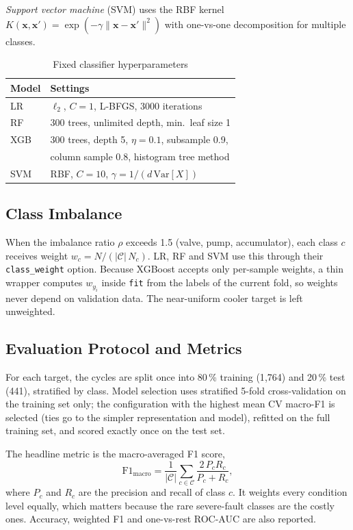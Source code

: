 \documentclass[conference]{IEEEtran}
\begin{document}
\textit{Support vector machine} (SVM) \cite{cortes1995} uses the RBF kernel
$K(\mathbf{x},\mathbf{x}')=\exp(-\gamma\lVert\mathbf{x}-\mathbf{x}'\rVert^2)$
with one-vs-one decomposition for multiple classes.

\begin{table}[t]
\centering
\caption{Fixed classifier hyperparameters}
\label{tab:hyper}
\begin{tabular}{@{}ll@{}}
\toprule
Model & Settings \\
\midrule
LR & $\ell_2$, $C=1$, L-BFGS, 3000 iterations \\
RF & 300 trees, unlimited depth, min.\ leaf size 1 \\
XGB & 300 trees, depth 5, $\eta=0.1$, subsample 0.9, \\
    & column sample 0.8, histogram tree method \\
SVM & RBF, $C=10$, $\gamma=1/(d\,\mathrm{Var}[X])$ \\
\bottomrule
\end{tabular}
\end{table}

\subsection{Class Imbalance}
When the imbalance ratio $\rho$ exceeds 1.5 (valve, pump, accumulator), each
class $c$ receives weight $w_c=N/(|\mathcal{C}|\,N_c)$. LR, RF and SVM use
this through their \texttt{class\_weight} option. Because XGBoost accepts only
per-sample weights, a thin wrapper computes $w_{y_i}$ inside \texttt{fit} from
the labels of the current fold, so weights never depend on validation data.
The near-uniform cooler target is left unweighted.

\subsection{Evaluation Protocol and Metrics}
For each target, the cycles are split once into 80\,\% training (1{,}764) and
20\,\% test (441), stratified by class. Model selection uses stratified 5-fold
cross-validation on the training set only; the configuration with the highest
mean CV macro-F1 is selected (ties go to the simpler representation and
model), refitted on the full training set, and scored exactly once on the
test set.

The headline metric is the macro-averaged F1 score,
\begin{equation}
\mathrm{F1}_{\text{macro}}=\frac{1}{|\mathcal{C}|}\sum_{c\in\mathcal{C}}
\frac{2\,P_c R_c}{P_c+R_c},
\end{equation}
where $P_c$ and $R_c$ are the precision and recall of class $c$. It weights
every condition level equally, which matters because the rare severe-fault
classes are the costly ones. Accuracy, weighted F1 and one-vs-rest ROC-AUC are
also reported.
\end{document}

